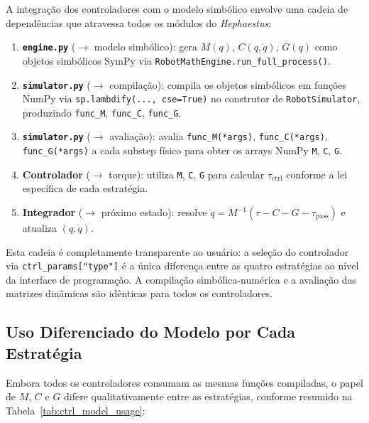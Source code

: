 A integração dos controladores com o modelo simbólico envolve uma cadeia de dependências que atravessa todos os módulos do \textit{Hephaestus}:

\begin{enumerate}
    \item \textbf{\texttt{engine.py}} ($\to$ modelo simbólico): gera $M(q)$, $C(q,\dot{q})$, $G(q)$ como objetos simbólicos SymPy via \texttt{RobotMathEngine.run\_full\_process()}.
    \item \textbf{\texttt{simulator.py}} ($\to$ compilação): compila os objetos simbólicos em funções NumPy via \texttt{sp.lambdify(..., cse=True)} no construtor de \texttt{RobotSimulator}, produzindo \texttt{func\_M}, \texttt{func\_C}, \texttt{func\_G}.
    \item \textbf{\texttt{simulator.py}} ($\to$ avaliação): avalia \texttt{func\_M(*args)}, \texttt{func\_C(*args)}, \texttt{func\_G(*args)} a cada substep físico para obter os arrays NumPy \texttt{M}, \texttt{C}, \texttt{G}.
    \item \textbf{Controlador} ($\to$ torque): utiliza \texttt{M}, \texttt{C}, \texttt{G} para calcular $\tau_{\text{ctrl}}$ conforme a lei específica de cada estratégia.
    \item \textbf{Integrador} ($\to$ próximo estado): resolve $\ddot{q} = M^{-1}(\tau - C - G - \tau_{\text{pass}})$ e atualiza $(q, \dot{q})$.
\end{enumerate}

Esta cadeia é completamente transparente ao usuário: a seleção do controlador via \texttt{ctrl\_params["type"]} é a única diferença entre as quatro estratégias ao nível da interface de programação. A compilação simbólica-numérica e a avaliação das matrizes dinâmicas são idênticas para todos os controladores.

\subsection{Uso Diferenciado do Modelo por Cada Estratégia}

Embora todos os controladores consumam as mesmas funções compiladas, o papel de $M$, $C$ e $G$ difere qualitativamente entre as estratégias, conforme resumido na Tabela~\ref{tab:ctrl_model_usage}:

